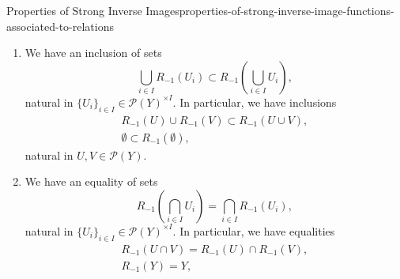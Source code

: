 \begin{proposition}{Properties of Strong Inverse Images}{properties-of-strong-inverse-image-functions-associated-to-relations}
\begin{enumerate}
\begin{webcompile}
            \end{webcompile}
            witnessed by a bijections of sets
            \[%
                \Hom_{\mathcal{P}(X)}(R_{!}(U),V)%
                \cong%
                \Hom_{\mathcal{P}(X)}(U,R_{-1}(V)),%
            \]%
            natural in $U\in\mathcal{P}(X)$ and $V\in\mathcal{P}(Y)$, i.e.\ such that:
            \begin{itemize}
                \itemstar The following conditions are equivalent:
                    \begin{itemize}
                        \item We have $R_{!}(U)\subset V$.
                        \item We have $U\subset R_{-1}(V)$.
                    \end{itemize}
            \end{itemize}
        \item\label{properties-of-strong-inverse-image-functions-associated-to-relations-lax-preservation-of-colimits}We have an inclusion of sets
            \[
                \bigcup_{i\in I}R_{-1}(U_{i})%
                \subset%
                R_{-1}(\bigcup_{i\in I}U_{i}),%
            \]%
            natural in $\{U_{i}\}_{i\in I}\in\mathcal{P}(Y)^{\times I}$. In particular, we have inclusions%
            \[
                \begin{gathered}
                    R_{-1}(U)\cup R_{-1}(V) \subset R_{-1}(U\cup V),\\
                    \emptyset               \subset R_{-1}(\emptyset),
                \end{gathered}
            \]%
            natural in $U,V\in\mathcal{P}(Y)$.
        \item\label{properties-of-strong-inverse-image-functions-associated-to-relations-preservation-of-limits}We have an equality of sets
            \[
                    R_{-1}(\bigcap_{i\in I}U_{i})%
                    =%
                    \bigcap_{i\in I}R_{-1}(U_{i}),%
            \]%
            natural in $\{U_{i}\}_{i\in I}\in\mathcal{P}(Y)^{\times I}$. In particular, we have equalities%
            \[
                \begin{gathered}
                    R_{-1}(U\cap V) = R_{-1}(U)\cap R_{-1}(V),\\
                    R_{-1}(Y)       = Y,
                \end{gathered}
            \]%

\end{enumerate}
\end{proposition}

